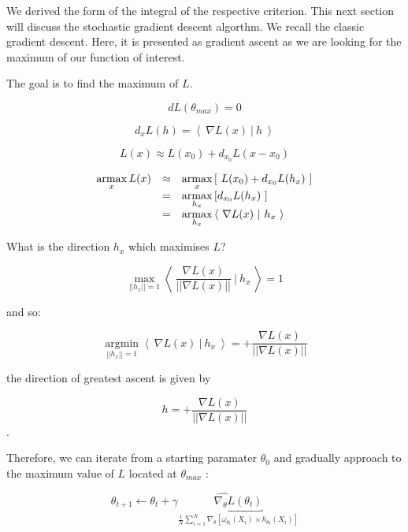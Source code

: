 We derived the form of the integral of the respective criterion. This next section will discuss the stochastic gradient descent algorthm. We recall the classic gradient descent. Here, it is presented as gradient ascent as we are looking for the maximum of our function of interest. 

\bigskip

The goal is to find the maximum of $L$.

$$dL(\theta_{max}) = 0$$

$$d_xL(h) = \left< \ \nabla L(x) \ | \ h \ \right>$$

$$L(x) \approx L(x_0) + d_{x_0}L(x - x_0)$$


$$
\begin{array}{rcl}
\argmax\limits_x L(x) &\approx& \argmax\limits_{x} \left[ \ L(x_0) + d_{x_0}L(h_x) \ \right]
\\
& = &
\argmax\limits_{h_x} \left[ d_{x_0}L(h_x) \ \right]
\\
& = &
\argmax\limits_{h_x} \left< \ \nabla L(x) \ | \ h_x \ \right>
\end{array}
$$


What is the direction $h_x$ which maximises $L$?

$$\underset{||h_x|| = 1}{\operatorname{max}} \left< \ \frac{\nabla L(x)}{|| \nabla L(x) ||} \ | \ h_x \ \right> = 1$$

and so:

$$\underset{||h_x|| = 1}{\operatorname{argmin}} \left< \ {\nabla L(x)} \ | \ h_x \ \right> = {+} \frac{\nabla L(x)}{|| \nabla L(x) ||}$$

the direction of greatest ascent is given by

$$h = + \frac{\nabla L(x)}{|| \nabla L(x) ||}$$.

\bigskip

Therefore, we can iterate from a starting paramater $\theta_0$ and gradually approach to the maximum value of $L$ located at $\theta_{max}$ :

\bigskip

$$\boxed{\theta_{t+1} \leftarrow \theta_t + \gamma \underbracket{ \widehat{\nabla_\theta L}(\theta_t)}_{\frac 1 N \displaystyle\sum_{i = 1}^N \nabla_\theta \left[\omega_{\theta_t}(X_i) \times h_{\theta_t}(X_i)\right]}}$$